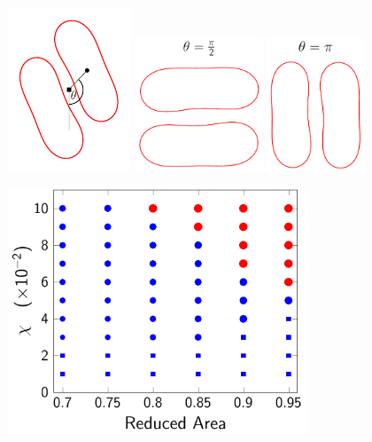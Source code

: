 \documentclass[prf,superscriptaddress,showpacs]{revtex4-1}
\begin{document}
\begin{figure}[htp]
  \begin{minipage}{0.53\textwidth}
    \includegraphics[width=0.33\textwidth]{figs/angleDefinition.pdf} \:
    \includegraphics[width=0.34\textwidth]{figs/rotate1.pdf} \:
    \includegraphics[width=0.26\textwidth]{figs/rotate2.pdf}
  \end{minipage}
  \hfill
  \begin{minipage}{0.45\textwidth}
    \centering
    \includegraphics[width=0.8\textwidth]{figs/extensional_adR4em1adS7em1_phaseDiagram.pdf}

\end{minipage}
\end{figure}
\end{document}
